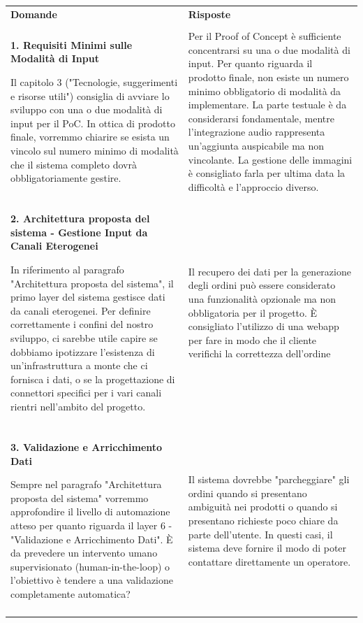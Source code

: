 \documentclass[a4paper, 11pt, oneside]{scrartcl} %
\begin{document}
\footnotesize  %
\setlength{\tabcolsep}{8pt}  %
\begin{tabular}{p{}p{}}
\textbf{Domande} & \textbf{Risposte} \\
\\
\textbf{1. Requisiti Minimi sulle Modalità di Input}

Il capitolo 3 ("Tecnologie, suggerimenti e risorse utili") consiglia di avviare lo sviluppo con una o due modalità di input per il PoC. In ottica di prodotto finale, vorremmo chiarire se esista un vincolo sul numero minimo di modalità che il sistema completo dovrà obbligatoriamente gestire. 
& 
Per il Proof of Concept è sufficiente concentrarsi su una o due modalità di input. Per quanto riguarda il prodotto finale, non esiste un numero minimo obbligatorio di modalità da implementare. La parte testuale è da considerarsi fondamentale, mentre l'integrazione audio rappresenta un'aggiunta auspicabile ma non vincolante. La gestione delle immagini è consigliato farla per ultima data la difficoltà e l'approccio diverso. \\
\\

\textbf{2. Architettura proposta del sistema - Gestione Input da Canali Eterogenei}

In riferimento al paragrafo "Architettura proposta del sistema", il primo layer del sistema gestisce dati da canali eterogenei. Per definire correttamente i confini del nostro sviluppo, ci sarebbe utile capire se dobbiamo ipotizzare l'esistenza di un'infrastruttura a monte che ci fornisca i dati, o se la progettazione di connettori specifici per i vari canali rientri nell'ambito del progetto.
&
Il recupero dei dati per la generazione degli ordini può essere considerato una funzionalità opzionale ma non obbligatoria per il progetto. È consigliato l'utilizzo di una webapp per fare in modo che il cliente verifichi la correttezza dell'ordine \\
\\

\textbf{3. Validazione e Arricchimento Dati}

Sempre nel paragrafo "Architettura proposta del sistema" vorremmo approfondire il livello di automazione atteso per quanto riguarda il layer 6 - "Validazione e Arricchimento Dati". È da prevedere un intervento umano supervisionato (human-in-the-loop) o l'obiettivo è tendere a una validazione completamente automatica?
&
Il sistema dovrebbe "parcheggiare" gli ordini quando si presentano ambiguità nei prodotti o quando si presentano richieste poco chiare da parte dell'utente. In questi casi, il sistema deve fornire il modo di poter contattare direttamente un operatore. \\
\\


\end{tabular}
\end{document}
